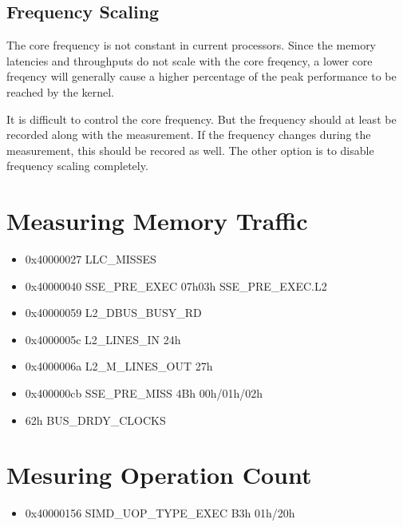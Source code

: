 \documentclass[a4paper,12pt]{article}
\begin{document}
\subsection{Frequency Scaling}
The core frequency is not constant in current processors. Since the memory latencies and throughputs do not scale with the core freqency, a lower core freqency will generally cause a higher percentage of the peak performance to be reached by the kernel.

It is difficult to control the core frequency. But the frequency should at least be recorded along with the measurement. If the frequency changes during the measurement, this should be recored as well. The other option is to disable frequency scaling completely.

\section{Measuring Memory Traffic}
\begin{itemize}
\item 0x40000027   LLC\_MISSES
\item 0x40000040   SSE\_PRE\_EXEC 07h03h SSE\_PRE\_EXEC.L2
\item 0x40000059   L2\_DBUS\_BUSY\_RD
\item 0x4000005c   L2\_LINES\_IN  24h
\item 0x4000006a   L2\_M\_LINES\_OUT  27h
\item 0x400000cb   SSE\_PRE\_MISS 4Bh 00h/01h/02h
\item 62h BUS\_DRDY\_CLOCKS
\end{itemize}


\section{Mesuring Operation Count}
\begin{itemize}
\item 0x40000156   SIMD\_UOP\_TYPE\_EXEC B3h 01h/20h
\end{itemize}


\listoffigures



\end{document}
